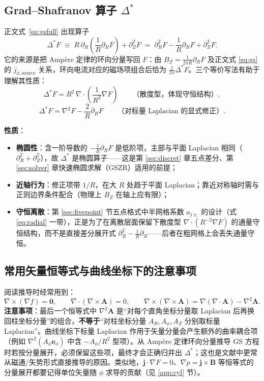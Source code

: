 \documentclass[12pt,fontset=none]{ctexart}
\numberwithin{equation}{section}
\numberwithin{table}{section}
\numberwithin{figure}{section}
\begin{document}
\subsection{\texorpdfstring{Grad--Shafranov 算子 $\Delta^*$}{Grad--Shafranov 算子 Delta*}}\label{app:gsop}

正文式~\eqref{eq:gsfull} 出现算子
\[
  \Delta^*F\;\equiv\;R\,\partial_R\!\left(\frac{1}{R}\partial_RF\right)+\partial_Z^2F
  \;=\;\partial_R^2F-\frac{1}{R}\partial_RF+\partial_Z^2F .
\]
它的来源是把 Ampère 定律的环向分量写回 $F$：由 $B_Z=\frac{1}{2\pi R}\partial_RF$ 及正文式 \eqref{eq:gs} 的 $j_{\phi,\mathrm{source}}$ 关系，环向电流对应的磁场项组合后恰为 $\frac{1}{2\pi}\Delta^*F$。三个等价写法有助于理解其性质：
\[
  \Delta^*F=R^2\,\nabla\cdot\!\left(\frac{1}{R^2}\nabla F\right)
  \qquad\text{（散度型，体现守恒结构）},
\]
\[
  \Delta^*F=\nabla^2F-\frac{2}{R}\partial_RF
  \qquad\text{（对标量 Laplacian 的显式修正）}.
\]

\textbf{性质}：
\begin{itemize}[nosep]
  \item \textbf{椭圆性}：含一阶导数的 $-\frac{1}{R}\partial_RF$ 是低阶项，主部与平面 Laplacian 相同（$\partial_R^2+\partial_Z^2$），故 $\Delta^*$ 是椭圆算子——这是第 \ref{sec:discret} 章五点差分、第 \ref{sec:solver} 章快速椭圆求解（GSZR）适用的前提；
  \item \textbf{近轴行为}：修正项带 $1/R$，在大 $R$ 处趋于平面 Laplacian；靠近对称轴时需与正则边界条件配合（物理上 $B_Z$ 在轴上应有限）；
  \item \textbf{守恒离散}：第 \ref{sec:fivepoint} 节五点格式中半网格系数 $a_{j\pm}$ 的设计（式 \eqref{eq:radial} 一带），正是为了在离散层面保留下散度型 $\nabla\cdot(R^{-2}\nabla F)$ 的通量守恒结构，而不是直接差分展开式 $\partial_R^2-\frac1R\partial_R$——后者在粗网格上会丢失通量守恒。
\end{itemize}

\subsection{常用矢量恒等式与曲线坐标下的注意事项}\label{app:ident}

阅读推导时经常用到：
\[
  \nabla\times(\nabla f)=\bm{0},\qquad
  \nabla\cdot(\nabla\times\bm{A})=0,\qquad
  \nabla\times(\nabla\times\bm{A})=\nabla(\nabla\cdot\bm{A})-\nabla^2\bm{A}.
\]
\textbf{注意事项}：最后一个恒等式中 $\nabla^2\bm{A}$ 是``对每个直角坐标分量取 Laplacian 后再换回柱坐标分量''的组合，\textbf{不等于}``对柱坐标分量 $A_R,A_\phi,A_Z$ 分别取标量 Laplacian''。曲线坐标下标量 Laplacian 作用于矢量分量会产生额外的曲率耦合项（例如 $\nabla^2(A_\phi\bm{e}_\phi)$ 中含 $-A_\phi/R^2$ 型项）。从 Ampère 定律环向分量推导 GS 方程时若按分量展开，必须保留这些项，最终才会正确归并出 $\Delta^*$；这也是文献中更常从磁通/矢势形式直接推导的原因。类似地，$\bm{j}\cdot\nabla F=0$、$\nabla p=\bm{j}\times\bm{B}$ 等恒等式的分量展开都要记得单位矢量随 $\phi$ 求导的贡献（见 \ref{app:cyl} 节）。
\end{document}
